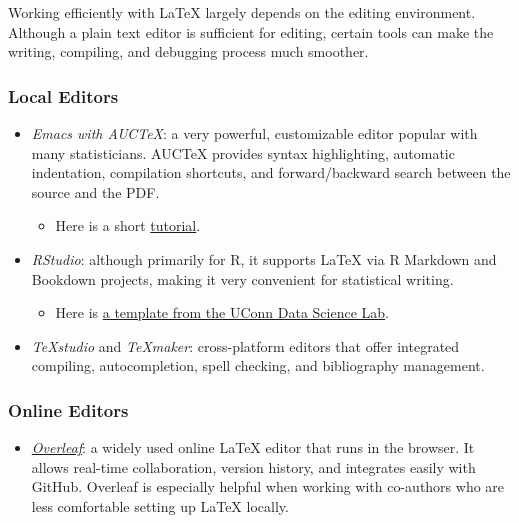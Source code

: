 \documentclass[
]{book}
\providecommand{\tightlist}{%
  \setlength{\itemsep}{0pt}\setlength{\parskip}{0pt}}
\theoremstyle{definition}
\theoremstyle{definition}
\theoremstyle{definition}
\theoremstyle{definition}
\theoremstyle{remark}
\begin{document}
Working efficiently with LaTeX largely depends on the editing environment.
Although a plain text editor is sufficient for editing, certain
tools can make the writing, compiling, and debugging process much smoother.

\subsubsection{Local Editors}\label{local-editors}

\begin{itemize}
\tightlist
\item
  \emph{Emacs with AUCTeX}: a very powerful, customizable editor popular with many
  statisticians. AUCTeX provides syntax highlighting,
  automatic indentation, compilation shortcuts, and forward/backward search
  between the source and the PDF.

  \begin{itemize}
  \tightlist
  \item
    Here is a short \href{https://michaelneuper.com/posts/efficient-latex-editing-with-emacs/}{tutorial}.
  \end{itemize}
\item
  \emph{RStudio}: although primarily for R, it supports LaTeX via R Markdown and
  Bookdown projects, making it very convenient for statistical writing.

  \begin{itemize}
  \tightlist
  \item
    Here is \href{https://statds.org/templates.html}{a template from the UConn Data Science Lab}.
  \end{itemize}
\item
  \emph{TeXstudio} and \emph{TeXmaker}: cross-platform editors that offer integrated
  compiling, autocompletion, spell checking, and bibliography management.
\end{itemize}

\subsubsection{Online Editors}\label{online-editors}

\begin{itemize}
\tightlist
\item
  \href{https://www.overleaf.com}{\emph{Overleaf}}: a widely used online LaTeX editor that
  runs in the browser.
  It allows real-time collaboration, version history, and
  integrates easily with GitHub. Overleaf is especially helpful when working
  with co-authors who are less comfortable setting up LaTeX locally.
\end{itemize}
\end{document}

